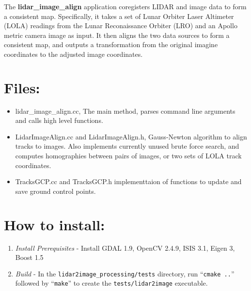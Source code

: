 \documentclass[float=false, crop=false]{standalone}
\begin{document}
The {\bf{lidar\_image\_align}} application coregisters LIDAR and image data to form a consistent map.
Specifically, it takes a set of Lunar Orbiter Laser Altimeter (LOLA) readings from
the Lunar Reconaissance Orbiter (LRO) and an Apollo metric camera image as input. It then
aligns the two data sources to form a consistent map, and outputs a transformation from
the original imagine coordinates to the adjusted image coordinates.

\section{Files:}

\begin{itemize}
\item{lidar\_image\_align.cc, The main method, parses command line arguments and calls high level
  functions.}
\item{LidarImageAlign.cc and LidarImageAlign.h, Gauss-Newton algorithm to align tracks to images.
 Also implements currently unused brute force search, and computes homographies between pairs of images,
 or two sets of LOLA track coordinates.}
\item{TracksGCP.cc and TracksGCP.h implementtaion of functions to update and save ground control points.}  
\end{itemize}

\section{How to install:}

\begin{enumerate}
	\item{\emph{Install Prerequisites}} - Install GDAL 1.9, OpenCV 2.4.9, ISIS 3.1, Eigen 3, Boost 1.5
	\item{\emph{Build }} - In the \texttt{lidar2image\_processing/tests} directory,
          run ``\texttt{cmake ..}'' followed by ``\texttt{make}'' to create the {\texttt{tests/lidar2image}}
          executable.
\end{enumerate}
\end{document}
